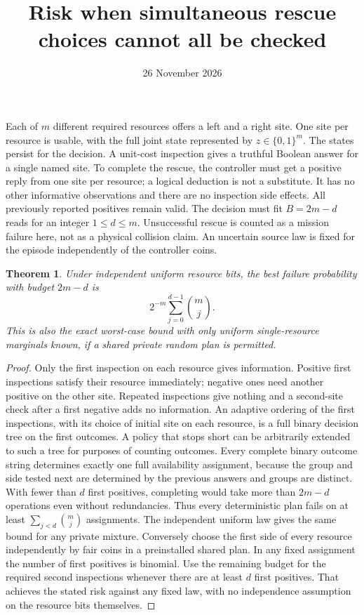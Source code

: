 \documentclass[11pt]{article}
\title{Risk when simultaneous rescue choices cannot all be checked}
\author{}
\date{26 November 2026}
\newtheorem{theorem}{Theorem}
\begin{document}
\maketitle

Each of $m$ different required resources offers a left and a right site. One site per resource is usable, with the full joint state represented by $z\in\{0,1\}^m$. The states persist for the decision. A unit-cost inspection gives a truthful Boolean answer for a single named site. To complete the rescue, the controller must get a positive reply from one site per resource; a logical deduction is not a substitute. It has no other informative observations and there are no inspection side effects. All previously reported positives remain valid. The decision must fit $B=2m-d$ reads for an integer $1\le d\le m$. Unsuccessful rescue is counted as a mission failure here, not as a physical collision claim. An uncertain source law is fixed for the episode independently of the controller coins.

\begin{theorem}
Under independent uniform resource bits, the best failure probability with budget $2m-d$ is
\[
 2^{-m}\sum_{j=0}^{d-1}\binom{m}{j}.
\]
This is also the exact worst-case bound with only uniform single-resource marginals known, if a shared private random plan is permitted.
\end{theorem}

\begin{proof}
Only the first inspection on each resource gives information. Positive first inspections satisfy their resource immediately; negative ones need another positive on the other site. Repeated inspections give nothing and a second-site check after a first negative adds no information. An adaptive ordering of the first inspections, with its choice of initial site on each resource, is a full binary decision tree on the first outcomes. A policy that stops short can be arbitrarily extended to such a tree for purposes of counting outcomes. Every complete binary outcome string determines exactly one full availability assignment, because the group and side tested next are determined by the previous answers and groups are distinct. With fewer than $d$ first positives, completing would take more than $2m-d$ operations even without redundancies. Thus every deterministic plan fails on at least $\sum_{j<d}\binom{m}{j}$ assignments. The independent uniform law gives the same bound for any private mixture. Conversely choose the first side of every resource independently by fair coins in a preinstalled shared plan. In any fixed assignment the number of first positives is binomial. Use the remaining budget for the required second inspections whenever there are at least $d$ first positives. That achieves the stated risk against any fixed law, with no independence assumption on the resource bits themselves.
\end{proof}
\end{document}
